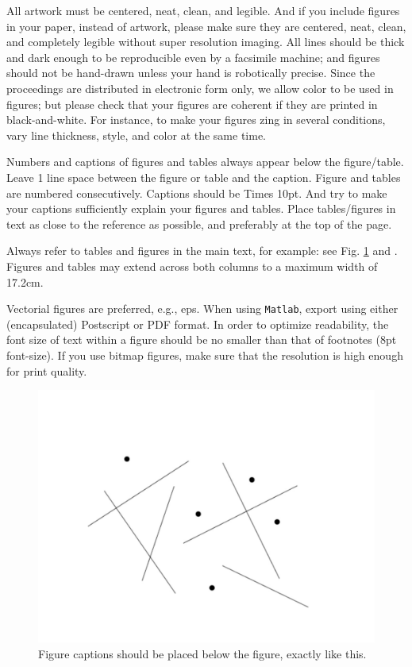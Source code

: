 \documentclass{article}
\begin{document}
All artwork must be centered, neat, clean, and legible.
And if you include figures in your paper, instead of artwork,
please make sure they are centered, neat, clean,
and completely legible without super resolution imaging.
All lines should be thick and dark enough to be reproducible
even by a facsimile machine;
and figures should not be hand-drawn unless your hand is robotically precise.
Since the proceedings are distributed in electronic form only, 
we allow color to be used in figures;
but please check that your figures are 
coherent if they are printed in black-and-white.
For instance, to make your figures zing in several conditions,
vary line thickness, style, and color at the same time.

Numbers and captions of figures and tables always appear below the figure/table.
Leave 1 line space between the figure or table and the caption.
Figure and tables are numbered consecutively. 
Captions should be Times 10pt.
And try to make your captions sufficiently explain your figures and tables.
Place tables/figures in text as close to the reference as possible, 
and preferably at the top of the page.

Always refer to tables and figures in the main text, for example:
see Fig. \ref{fig:example} and .
Figures and tables may extend across both columns to a maximum width of 17.2cm.

Vectorial figures are preferred, e.g., eps.
When using \texttt{Matlab}, 
export using either (encapsulated) Postscript or PDF format. 
In order to optimize readability, 
the font size of text within a figure should be no smaller than
that of footnotes (8pt font-size). 
If you use bitmap figures, make sure that 
the resolution is high enough for print quality. 

\begin{figure}[t]
\centering
\includegraphics[width=0.9\columnwidth]{figure}
\caption{Figure captions should be placed below the figure, 
exactly like this.
\label{fig:example}}
\end{figure}
\end{document}
